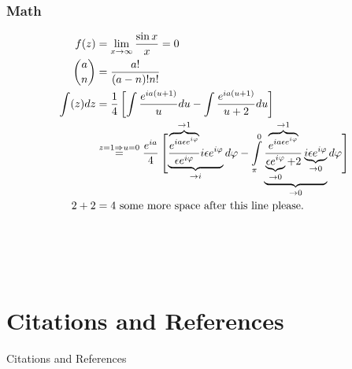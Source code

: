 \begin{frame}
	\frametitle{Math}
	\begin{align}
			 f(z) &= 
			 	\lim\limits_{x\rightarrow \infty} \frac{\sin x}{x} = 0\\
		 	 \binom{a}{n} &= 
		 	 	\frac{a!}{(a-n)! n!}\\
		 	 \nonumber \int(z) dz &=  
		 	 	\frac14 \left[ \int\frac{e^{ia(u + 1)}}{u} du - \int\frac{e^{ia(u + 1)}}{u + 2}du   \right]\\[1em]
		 	 & \overset{z = 1 \Rightarrow u = 0}=  
		 	 	\frac{e^{i a}}{4} \left[\vphantom{ \int\limits_{\pi}^0} \smash{ \underbrace{\frac{\overbrace{e^{ia \epsilon e^{i \varphi}}}^{\rightarrow 1}} {\epsilon e^{i \varphi}} i \epsilon e^{i \varphi}}_{\rightarrow i}  d \varphi            - \int\limits_{\pi}^0 \underbrace{\frac{\overbrace{e^{ia \epsilon e^{i \varphi}}}^{\rightarrow 1}} {\underbrace{\epsilon e^{i \varphi}}_{\rightarrow 0} + 2} \underbrace{i \epsilon e^{i \varphi}}_{\rightarrow 0}}_{\rightarrow 0}  d \varphi  }\right]\\[2em]
		 	 2 + 2 &= 4 \ \text{some more space after this line please.}\\[4em]\nonumber
	\end{align}
\end{frame}













\section{Citations and References}


\begin{frame}{Citations and References}
    \cite{AHF}
    
    \parencite{AMR}
    
    \renewcommand*{\bibfont}{\footnotesize}
    \printbibliography[]    
\end{frame}







